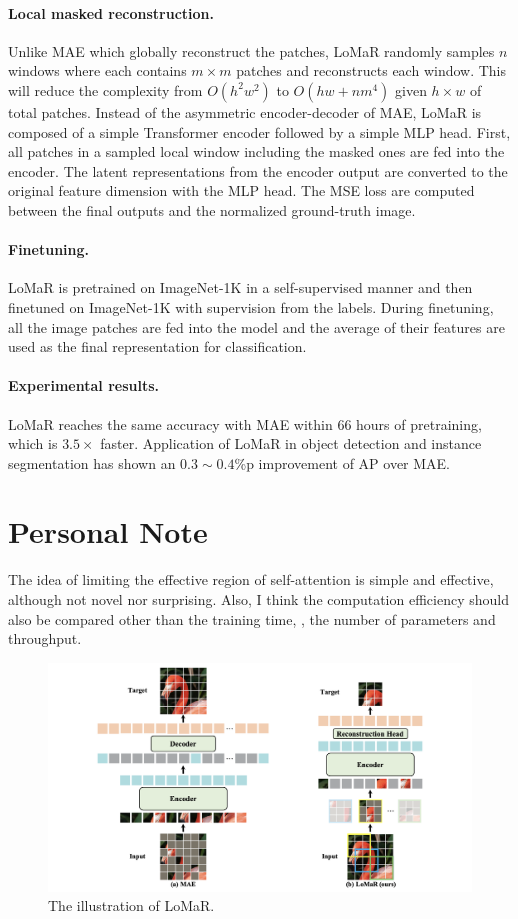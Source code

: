 \documentclass[10pt,twocolumn,letterpaper]{article}
\begin{document}
\paragraph{Local masked reconstruction.}
Unlike MAE which globally reconstruct the patches, LoMaR randomly samples $n$ windows where each contains $m \times m$ patches and reconstructs each window.
This will reduce the complexity from $O(h^2w^2)$ to $O(hw+nm^4)$ given $h \times w$ of total patches.
Instead of the asymmetric encoder-decoder of MAE, LoMaR is composed of a simple Transformer encoder followed by a simple MLP head.
First, all patches in a sampled local window including the masked ones are fed into the encoder.
The latent representations from the encoder output are converted to the original feature dimension with the MLP head.
The MSE loss are computed between the final outputs and the normalized ground-truth image.

\paragraph{Finetuning.}
LoMaR is pretrained on ImageNet-1K in a self-supervised manner and then finetuned on ImageNet-1K with supervision from the labels.
During finetuning, all the image patches are fed into the model and the average of their features are used as the final representation for classification.

\paragraph{Experimental results.}
LoMaR reaches the same accuracy with MAE within 66 hours of pretraining, which is $3.5\times$ faster.
Application of LoMaR in object detection and instance segmentation has shown an $0.3 \sim 0.4$\%p improvement of AP over MAE.


\section{Personal Note}
The idea of limiting the effective region of self-attention is simple and effective, although not novel nor surprising.
Also, I think the computation efficiency should also be compared other than the training time, \eg, the number of parameters and throughput.




\begin{figure}[t]
    \includegraphics[width=\linewidth, trim={50mm 0 40mm 0}, clip]{assets/lomar.png}
    \caption{\label{fig:overview}The illustration of LoMaR.}
\end{figure}


{\small


}
\end{document}
